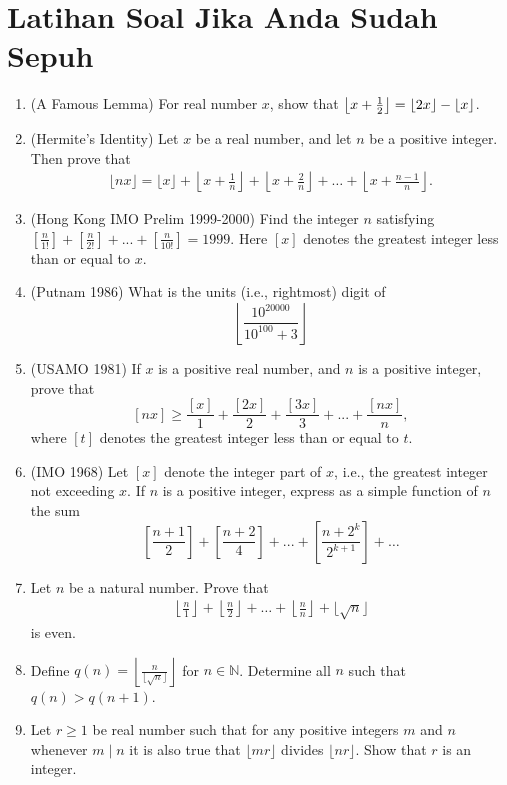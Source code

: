 \documentclass[11pt]{scrartcl}
\begin{document}
\section{Latihan Soal Jika Anda Sudah Sepuh}
\begin{enumerate}
    \item (A Famous Lemma) For real number $x$, show that $\left\lfloor x+\frac{1}{2} \right\rfloor = \left\lfloor 2x \right\rfloor-\left\lfloor x \right\rfloor$.

    \item (Hermite's Identity) Let $x$ be a real number, and let $n$ be a positive integer. Then prove that
    \begin{align*}
         \lfloor nx \rfloor = \lfloor x \rfloor + \left\lfloor x+\frac{1}{n} \right\rfloor + \left\lfloor x+\frac{2}{n} \right\rfloor + \dots + \left\lfloor x+\frac{n-1}{n} \right\rfloor.
    \end{align*}
    

    \item (Hong Kong IMO Prelim 1999-2000) Find the integer $n$ satisfying $\left[\frac{n}{1!}\right]+\left[\frac{n}{2!}\right]+...+\left[\frac{n}{10!}\right]=1999$. Here $[x]$ denotes the greatest integer less than or equal to $x$.

    \item (Putnam 1986) What is the units (i.e., rightmost) digit of
\[\left\lfloor \frac{10^{20000}}{10^{100}+3}\right\rfloor\]

    \item  (USAMO 1981) If $x$ is a positive real number, and $n$ is a positive integer, prove that
\[[nx] \geq \frac{[x]}{1} + \frac{[2x]}{2} + \frac{[3x]}{3} + ... + \frac{[nx]}{n},\]where $[t]$ denotes the greatest integer less than or equal to $t$.

    \item (IMO 1968) Let $[x]$ denote the integer part of $x$, i.e., the greatest integer not exceeding $x$. If $n$ is a positive integer, express as a simple function of $n$ the sum\[\left[\frac{n+1}{2}\right]+\left[\frac{n+2}{4}\right]+...+\left[\frac{n+2^k}{2^{k+1}}\right]+\ldots\]

    \item Let $n$ be a natural number. Prove that
    \begin{align*}
        \left\lfloor \frac{n}{1} \right\rfloor + \left\lfloor \frac{n}{2} \right\rfloor + \dots + \left\lfloor \frac{n}{n} \right\rfloor + \lfloor \sqrt{n} \rfloor
    \end{align*}
    is even.

    \item Define $q(n)=\left\lfloor\frac{n}{\lfloor\sqrt{n}\rfloor}\right\rfloor$ for $n \in \mathbb{N}$. Determine all $n$ such that $q(n)>q(n+1)$.

    \item Let $r \ge 1$ be real number such that for any positive integers $m$ and $n$ whenever $m \mid n$ it is also true that $\lfloor mr \rfloor$ divides $\lfloor nr \rfloor$. Show that $r$ is an integer.
\end{enumerate}
\end{document}

